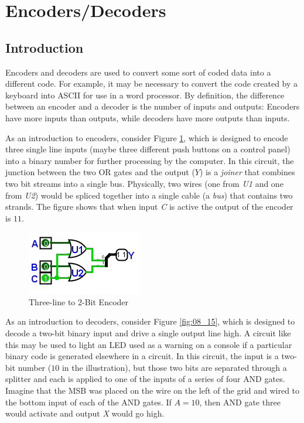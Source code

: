 \section{Encoders/Decoders}
\label{CL:sec:encoders_decoders}

\subsection{Introduction}
\label{CL:subsec:introduction_to_encoders_decoders}

Encoders and decoders are used to convert some sort of coded data into a different code. For example, it may be necessary to convert the code created by a keyboard into \ac{ASCII} for use in a word processor. By definition, the difference between an encoder and a decoder is the number of inputs and outputs: Encoders have more inputs than outputs, while decoders have more outputs than inputs. 

As an introduction to encoders, consider Figure \ref{fig:08_14}, which is designed to encode three single line inputs (maybe three different push buttons on a control panel) into a binary number for further processing by the computer. In this circuit, the junction between the two \textsf{OR} gates and the output ($ Y $) is a \emph{joiner} that combines two bit streams into a single bus. Physically, two wires (one from \emph{U1} and one from \emph{U2}) would be spliced together into a single cable (a \emph{bus}) that contains two strands. The figure shows that when input \emph{C} is active the output of the encoder is $ 11 $.

\begin{figure}[H]
	\centering
	\includegraphics[width=\maxwidth{.95\linewidth}]{gfx/08_14}
	\caption{Three-line to 2-Bit Encoder}
	\label{fig:08_14}
\end{figure}
 
As an introduction to decoders, consider Figure \ref{fig:08_15}, which is designed to decode a two-bit binary input and drive a single output line high. A circuit like this may be used to light an \ac{LED} used as a warning on a console if a particular binary code is generated elsewhere in a circuit. In this circuit, the input is a two-bit number ($ 10 $ in the illustration), but those two bits are separated through a splitter and each is applied to one of the inputs of a series of four \textsf{AND} gates. Imagine that the \ac{MSB} was placed on the wire on the left of the grid and wired to the bottom input of each of the \textsf{AND} gates. If $ A=10 $, then \textsf{AND} gate three would activate and output \emph{X} would go high.

